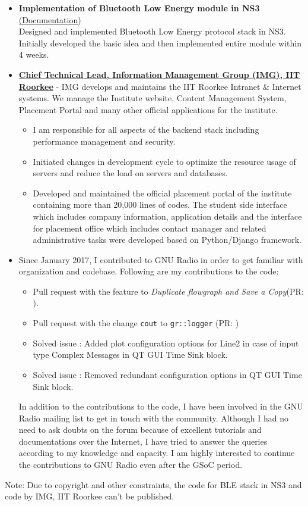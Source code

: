 \documentclass[a4paper, 11pt]{article}
\begin{document}
\begin{itemize}
\item \textbf{Implementation of Bluetooth Low Energy module in NS3} \href{http://kartikpatel.in/ns-3-dev-git/}{(Documentation)}\\ Designed and implemented Bluetooth Low Energy protocol stack in NS3. Initially developed the basic idea and then implemented entire module within 4 weeks.

\item \href{http://img.channeli.in}{\textbf{Chief Technical Lead, Information Management Group (IMG), IIT Roorkee}} - IMG develops and maintains the IIT Roorkee Intranet \& Internet systems. We manage the Institute website, Content Management System, Placement Portal and many other official applications for the institute.
\begin{itemize}
\item I am responsible for all aspects of the backend stack including performance management and security. 
\item Initiated changes in development cycle to optimize the resource usage of servers and reduce the load on servers and databases.
\item Developed and maintained the official placement portal of the institute containing more than 20,000 lines of codes. The student side interface which includes company information, application details and the interface for placement office which includes contact manager and related administrative tasks were developed based on Python/Django framework.
\end{itemize}

\item Since January 2017, I contributed to GNU Radio in order to get familiar with organization and codebase. Following are my contributions to the code:
\begin{itemize}
\item Pull request with the feature to \textit{Duplicate flowgraph and Save a Copy}(PR: ).
\item Pull request with the change \texttt{cout} to \texttt{gr::logger} (PR: )
\item Solved issue : Added plot configuration options for Line2 in case of input type Complex Messages in QT GUI Time Sink block.
\item Solved issue : Removed redundant configuration options in QT GUI Time Sink block.
\end{itemize}

In addition to the contributions to the code, I have been involved in the GNU Radio mailing list to get in touch with the community. Although I had no need to ask doubts on the forum because of excellent tutorials and documentations over the Internet, I have tried to answer the queries according to my knowledge and capacity. I am highly interested to continue the contributions to GNU Radio even after the GSoC period. 

\end{itemize}
Note: Due to copyright and other constraints, the code for BLE stack in NS3 and code by IMG, IIT Roorkee can't be published.
\end{document}
